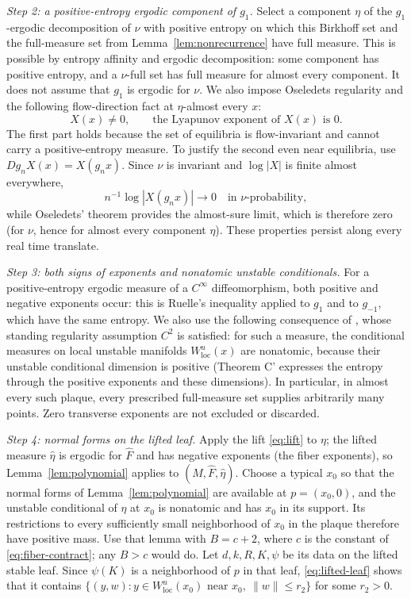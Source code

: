 \documentclass[11pt]{article}
\theoremstyle{remark}
\begin{document}
\emph{Step 2: a positive-entropy ergodic component of \(g_1\).}
Select a component \(\eta\) of the \(g_1\)-ergodic decomposition of
\(\nu\) with positive entropy on
which this Birkhoff set and the full-measure set from
Lemma~\ref{lem:nonrecurrence} have full measure.
This is possible by entropy affinity and ergodic decomposition:
some component has positive entropy, and a \(\nu\)-full set has full
measure for almost every component.
It does not assume that \(g_1\) is ergodic for \(\nu\).
We also impose Oseledets regularity and the following
flow-direction fact at \(\eta\)-almost every \(x\):
\begin{equation}\label{eq:flow-exponent}
 X(x)\ne0,\qquad
 \text{the Lyapunov exponent of }X(x)\text{ is }0.
\end{equation}
The first part holds because the set of equilibria is flow-invariant
and cannot carry a positive-entropy measure.  To justify the second
even near equilibria, use \(Dg_nX(x)=X(g_nx)\).
Since \(\nu\) is invariant and \(\log|X|\) is finite almost
everywhere,
\[
 n^{-1}\log|X(g_nx)|\longrightarrow0
                  \quad\text{in }\nu\text{-probability},
\]
while Oseledets' theorem provides the almost-sure limit, which is
therefore zero (for \(\nu\), hence for almost every component
\(\eta\)).
These properties persist along every real time translate.

\emph{Step 3: both signs of exponents and nonatomic unstable
conditionals.}
For a positive-entropy ergodic measure of a \(C^\infty\)
diffeomorphism, both positive and negative exponents occur: this is
Ruelle's inequality \cite{Ruelle1978} applied to \(g_1\) and to
\(g_{-1}\), which have the same entropy.
We also use the following consequence of
\cite[Corollary 7.2.2 and Theorem C']{LedrappierYoung1985II}, whose
standing regularity assumption \(C^2\) is satisfied: for such a
measure, the conditional measures on local unstable manifolds
\(W^u_{\mathrm{loc}}(x)\) are nonatomic, because their unstable
conditional dimension is positive (Theorem C' expresses the entropy
through the positive exponents and these dimensions).
In particular, in almost every such plaque, every prescribed
full-measure set supplies arbitrarily many points.
Zero transverse exponents are not excluded or discarded.

\emph{Step 4: normal forms on the lifted leaf.}
Apply the lift \eqref{eq:lift} to \(\eta\); the lifted measure
\(\widehat\eta\) is ergodic for \(\widehat F\) and has negative
exponents (the fiber exponents), so Lemma~\ref{lem:polynomial}
applies to \((\widehat M,\widehat F,\widehat\eta)\).
Choose a typical \(x_0\) so that the normal forms of
Lemma~\ref{lem:polynomial} are available at \(p=(x_0,0)\), and the
unstable conditional of \(\eta\) at \(x_0\) is nonatomic and has
\(x_0\) in its support.  Its restrictions to every sufficiently small
neighborhood of \(x_0\) in the plaque therefore have positive mass.
Use that lemma with \(B=c+2\),
where \(c\) is the constant of \eqref{eq:fiber-contract}; any
\(B>c\) would do.
Let \(d,k,R,K,\psi\) be its data on the lifted stable leaf.
Since \(\psi(K)\) is a neighborhood of \(p\) in that leaf,
\eqref{eq:lifted-leaf} shows that it contains
\(\{(y,w):y\in W^u_{\mathrm{loc}}(x_0)\text{ near }x_0,\ \|w\|\le r_2\}\)
for some \(r_2>0\).
\end{document}
